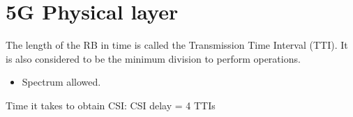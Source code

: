 \section{5G Physical layer}
\label{sec:5gphy}

The length of the RB in time is called the Transmission Time Interval
(TTI). It is also considered to be the minimum division to perform operations. 



\begin{itemize}
    \item Spectrum allowed. 
\end{itemize}




Time it takes to obtain CSI: CSI delay = 4 TTIs